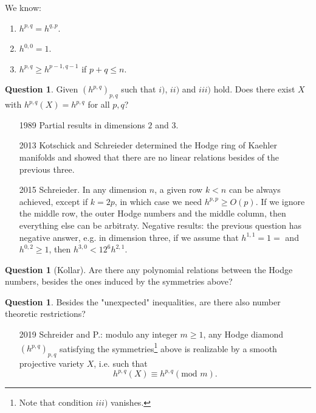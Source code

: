 \documentclass[11pt,A4]{article}
\theoremstyle{plain}
\theoremstyle{definition}
\newtheorem{q}[thm]{Question}
\theoremstyle{remark}
\newcommand{\1}{\mathbbm{1}}
\begin{document}
We know:
\begin{enumerate}[label=\roman*)]
    \item $h^{p,q}=h^{q,p}$.
    \item $h^{0,0}=1$.
    \item $h^{p,q}\geqslant h^{p-1,q-1}$ if $p+q \leqslant n$.
\end{enumerate}

\begin{q}
    Given $(h^{p,q})_{p,q}$ such that $i)$, $ii)$ and $iii)$ hold.
    Does there exist $X$ with $h^{p,q}(X)=h^{p,q}$ for all $p,q$?
\end{q}

\begin{itemize}
    \item [1989] Partial results in dimensions $2$ and $3$.
    \item [2013] Kotschick and Schreieder determined the Hodge ring of Kaehler manifolds and showed that there are no linear relations besides of the previous three.
    \item [2015] Schreieder.
	\subitem In any dimension $n$, a given row $k<n$ can be always achieved, except if $k=2p$, in which case we need $h^{p,p}\geqslant O(p)$.
	\subitem If we ignore the middle row, the outer Hodge numbers and the middle column, then everything else can be arbitraty.
	\subitem Negative results: the previous question has negative answer, e.g. in dimension three, if we assume that $h^{1,1}=1=$ and $h^{0,2}\geqslant 1$, then $h^{3,0}<12^{6}h^{2,1}$.
\end{itemize}

\begin{q}[Kollar]
    Are there any polynomial relations between the Hodge numbers, besides the ones induced by the symmetries above?
\end{q}

\begin{q}
    Besides the "unexpected" inequalities, are there also number theoretic restrictions?
\end{q}

\begin{itemize}
    \item [2019] Schreider and P.: modulo any integer $m\geqslant 1$, any Hodge diamond $(h^{p,q})_{p,q}$ satisfying the symmetries\footnote{Note that condition $iii)$ vanishes.} above is realizable by a smooth projective variety $X$, i.e. such that
	\[ h^{p,q}(X)\equiv h^{p,q} (\text{mod } m). \]
\end{itemize}
\end{document}
